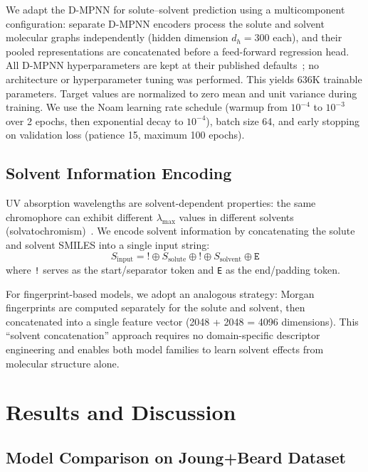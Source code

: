 \documentclass[journal=jcisd8,manuscript=article]{achemso}
\begin{document}
We adapt the D-MPNN for solute--solvent prediction using a multicomponent configuration: separate D-MPNN encoders process the solute and solvent molecular graphs independently (hidden dimension $d_h = 300$ each), and their pooled representations are concatenated before a feed-forward regression head.
All D-MPNN hyperparameters are kept at their published defaults~\cite{yangAnalyzingLearnedMolecular2019}; no architecture or hyperparameter tuning was performed.
This yields 636K trainable parameters.
Target values are normalized to zero mean and unit variance during training.
We use the Noam learning rate schedule (warmup from $10^{-4}$ to $10^{-3}$ over 2 epochs, then exponential decay to $10^{-4}$), batch size 64, and early stopping on validation loss (patience 15, maximum 100 epochs).


\subsection{Solvent Information Encoding}
\label{sec:solvent}

UV absorption wavelengths are solvent-dependent properties: the same chromophore can exhibit different $\lambda_{\max}$ values in different solvents (solvatochromism)~\cite{reichardt2011solvents}.
We encode solvent information by concatenating the solute and solvent SMILES into a single input string:
\begin{equation}
    S_{\text{input}} = \texttt{!} \oplus S_{\text{solute}} \oplus \texttt{!} \oplus S_{\text{solvent}} \oplus \texttt{E}
\end{equation}
where \texttt{!} serves as the start/separator token and \texttt{E} as the end/padding token.

For fingerprint-based models, we adopt an analogous strategy: Morgan fingerprints are computed separately for the solute and solvent, then concatenated into a single feature vector (2048 + 2048 = 4096 dimensions).
This ``solvent concatenation'' approach requires no domain-specific descriptor engineering and enables both model families to learn solvent effects from molecular structure alone.


\section{Results and Discussion}
\label{sec:results}

\subsection{Model Comparison on Joung+Beard Dataset}
\label{sec:model_comparison}
\end{document}
